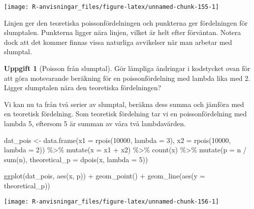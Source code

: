\documentclass[
]{book}
\newenvironment{Shaded}{\begin{snugshade}}{\end{snugshade}}
\newcommand{\AttributeTok}[1]{\textcolor[rgb]{0.77,0.63,0.00}{#1}}
\newcommand{\DecValTok}[1]{\textcolor[rgb]{0.00,0.00,0.81}{#1}}
\newcommand{\FunctionTok}[1]{\textcolor[rgb]{0.00,0.00,0.00}{#1}}
\newcommand{\NormalTok}[1]{#1}
\newcommand{\OtherTok}[1]{\textcolor[rgb]{0.56,0.35,0.01}{#1}}
\newcommand{\SpecialCharTok}[1]{\textcolor[rgb]{0.00,0.00,0.00}{#1}}
\theoremstyle{definition}
\theoremstyle{definition}
\theoremstyle{definition}
\newtheorem{exercise}{Uppgift}[chapter]
\theoremstyle{definition}
\theoremstyle{remark}
\begin{document}
\begin{center}\texttt{[image: R-anvisningar\_files/figure-latex/unnamed-chunk-155-1]} \end{center}

Linjen ger den teoretiska poissonfördelningen och punkterna ger fördelningen för slumptalen. Punkterna ligger nära linjen, vilket är helt efter förväntan. Notera dock att det kommer finnas vissa naturliga avvikelser när man arbetar med slumptal.

\begin{exercise}[Poisson från slumptal]
Gör lämpliga ändringar i kodstycket ovan för att göra motsvarande beräkning för en poissonfördelning med lambda lika med 2. Ligger slumptalen nära den teoretiska fördelningen?
\end{exercise}

Vi kan nu ta från två serier av slumptal, beräkna dess summa och jämföra med en teoretisk fördelning. Som teoretisk fördelning tar vi en poissonfördelning med lambda 5, eftersom 5 är summan av våra två lambdavärden.

\begin{Shaded}
\begin{Highlighting}[]
\NormalTok{dat\_pois }\OtherTok{\textless{}{-}} \FunctionTok{data.frame}\NormalTok{(}\AttributeTok{x1 =} \FunctionTok{rpois}\NormalTok{(}\DecValTok{10000}\NormalTok{, }\AttributeTok{lambda =} \DecValTok{3}\NormalTok{),}
                       \AttributeTok{x2 =} \FunctionTok{rpois}\NormalTok{(}\DecValTok{10000}\NormalTok{, }\AttributeTok{lambda =} \DecValTok{2}\NormalTok{)) }\SpecialCharTok{\%\textgreater{}\%} 
  \FunctionTok{mutate}\NormalTok{(}\AttributeTok{x =}\NormalTok{ x1 }\SpecialCharTok{+}\NormalTok{ x2) }\SpecialCharTok{\%\textgreater{}\%} 
  \FunctionTok{count}\NormalTok{(x) }\SpecialCharTok{\%\textgreater{}\%} 
  \FunctionTok{mutate}\NormalTok{(}\AttributeTok{p =}\NormalTok{ n }\SpecialCharTok{/} \FunctionTok{sum}\NormalTok{(n),}
         \AttributeTok{theoretical\_p =} \FunctionTok{dpois}\NormalTok{(x, }\AttributeTok{lambda =} \DecValTok{5}\NormalTok{))}

\FunctionTok{ggplot}\NormalTok{(dat\_pois, }\FunctionTok{aes}\NormalTok{(x, p)) }\SpecialCharTok{+}
  \FunctionTok{geom\_point}\NormalTok{() }\SpecialCharTok{+}
  \FunctionTok{geom\_line}\NormalTok{(}\FunctionTok{aes}\NormalTok{(}\AttributeTok{y =}\NormalTok{ theoretical\_p))}
\end{Highlighting}
\end{Shaded}

\begin{center}\texttt{[image: R-anvisningar\_files/figure-latex/unnamed-chunk-156-1]} \end{center}
\end{document}
